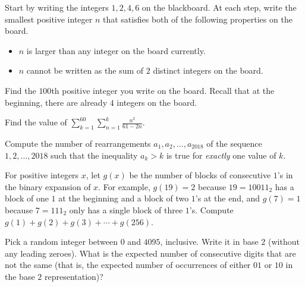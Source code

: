 \documentclass[11pt,paper=letter]{scrartcl}
\begin{document}
\begin{mdframed}[style=exmdbox]

\begin{problem}
  Start by writing the integers $1, 2, 4, 6$ on the blackboard. At each step, write the smallest positive integer $n$ that satisfies both of the following properties on the board.
  \begin{itemize}
    \item $n$ is larger than any integer on the board currently.
    \item $n$ cannot be written as the sum of $2$ distinct integers on the board.
  \end{itemize}
  Find the $100$th positive integer you write on the board. Recall that at the beginning, there are already $4$ integers on the board.
\end{problem}

\begin{problem}
  Find the value of $\displaystyle \sum_{k=1}^{60} \sum_{n=1}^k \frac{n^2}{61 - 2n}$. \hint{\ref{h:6}}
\end{problem}

\begin{problem}
  Compute the number of rearrangements $a_1, a_2, \ldots, a_{2018}$ of the sequence $1, 2, \ldots, 2018$ such that the inequality $a_k > k$ is true for \emph{exactly} one value of $k$.
\end{problem}

\begin{problem}
  For positive integers $x$, let $g(x)$ be the number of blocks of consecutive $1$'s in the binary expansion of $x$. For example, $g(19) = 2$ because $19 = 10011_2$ has a block of one $1$ at the beginning and a block of two $1$'s at the end, and $g(7) = 1$ because $7 = 111_2$ only has a single block of three $1$'s. Compute $g(1) + g(2) + g(3) + \cdots + g(256)$.
\end{problem}

\begin{problem}
  Pick a random integer between $0$ and $4095$, inclusive. Write it in base $2$ (without any leading zeroes). What is the expected number of consecutive digits that are not the same (that is, the expected number of occurrences of either $01$ or $10$ in the base $2$ representation)?
\end{problem}

\end{mdframed}
\end{document}
